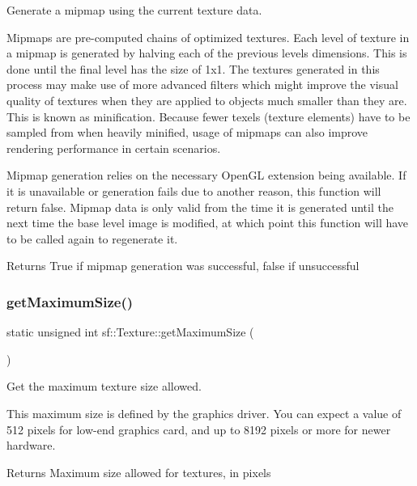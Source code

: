 Generate a mipmap using the current texture data. 

Mipmaps are pre-\/computed chains of optimized textures. Each level of texture in a mipmap is generated by halving each of the previous level\textquotesingle{}s dimensions. This is done until the final level has the size of 1x1. The textures generated in this process may make use of more advanced filters which might improve the visual quality of textures when they are applied to objects much smaller than they are. This is known as minification. Because fewer texels (texture elements) have to be sampled from when heavily minified, usage of mipmaps can also improve rendering performance in certain scenarios.

Mipmap generation relies on the necessary Open\+GL extension being available. If it is unavailable or generation fails due to another reason, this function will return false. Mipmap data is only valid from the time it is generated until the next time the base level image is modified, at which point this function will have to be called again to regenerate it.

\begin{DoxyReturn}{Returns}
True if mipmap generation was successful, false if unsuccessful 
\end{DoxyReturn}
\mbox{\label{classsf_1_1_texture_a0bf905d487b104b758549c2e9e20a3fb}} 
\subsubsection{\texorpdfstring{get\+Maximum\+Size()}{getMaximumSize()}}
{\footnotesize\ttfamily static unsigned int sf\+::\+Texture\+::get\+Maximum\+Size (\begin{DoxyParamCaption}{ }\end{DoxyParamCaption})\hspace{0.3cm}{\ttfamily [static]}}



Get the maximum texture size allowed. 

This maximum size is defined by the graphics driver. You can expect a value of 512 pixels for low-\/end graphics card, and up to 8192 pixels or more for newer hardware.

\begin{DoxyReturn}{Returns}
Maximum size allowed for textures, in pixels 
\end{DoxyReturn}
\mbox{\label{classsf_1_1_texture_a674b632608747bfc27b53a4935c835b0}} 
